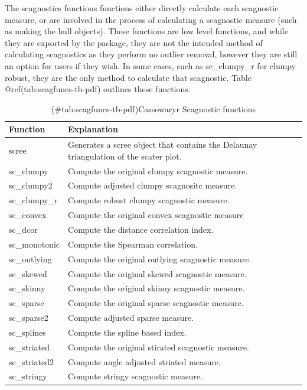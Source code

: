 The scagnostics functions functions either directly calculate each
scagnostic measure, or are involved in the process of calculating a
scagnostic measure (such as making the hull objects). These functions
are low level functions, and while they are exported by the package,
they are not the intended method of calculating scagnostics as they
perform no outlier removal, however they are still an option for users
if they wish. In some cases, such as sc\_clumpy\_r for clumpy robust,
they are the only method to calculate that scagnostic. Table
@ref(tab:scagfuncs-tb-pdf) outlines these functions.

\begin{Schunk}
\begin{table}

\caption{(\#tab:scagfuncs-tb-pdf)Cassowaryr Scagnostic functions}
\centering
\begin{tabular}[t]{>{\raggedright\arraybackslash}p{3cm}>{\raggedright\arraybackslash}p{10cm}}
\toprule
Function & Explanation\\
\midrule
scree & Generates a scree object that contains the Delaunay triangulation of the scater plot.\\
sc\_clumpy & Compute the original clumpy scagnostic measure.\\
sc\_clumpy2 & Compute adjusted clumpy scagnositc measure.\\
sc\_clumpy\_r & Compute robust clumpy scagnostic measure.\\
sc\_convex & Compute the original convex scagnostic measure\\
\addlinespace
sc\_dcor & Compute the distance correlation index.\\
sc\_monotonic & Compute the Spearman correlation.\\
sc\_outlying & Compute the original outlying scagnostic measure.\\
sc\_skewed & Compute the original skewed scagnostic measure.\\
sc\_skinny & Compute the original skinny scagnostic measure.\\
\addlinespace
sc\_sparse & Compute the original sparse scagnostic measure.\\
sc\_sparse2 & Compute adjusted sparse measure.\\
sc\_splines & Compute the spline based index.\\
sc\_striated & Compute the original stirated scagnostic measure.\\
sc\_striated2 & Compute angle adjusted striated measure.\\
\addlinespace
sc\_stringy & Compute stringy scagnostic measure.\\
\bottomrule
\end{tabular}
\end{table}

\end{Schunk}


